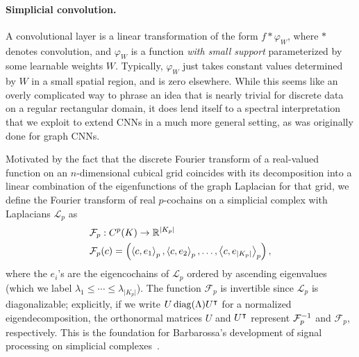 \paragraph{Simplicial convolution.}
 
A convolutional layer is a linear transformation of the form $f\ast \varphi_W$, where $\ast$ denotes convolution, and $\varphi_W$ is a function
\emph{with small support} 
parameterized by some learnable weights $W$.
Typically, $\varphi_W$ just takes constant values determined by $W$ in a small spatial region, and is zero elsewhere.
While this seems like an overly complicated way to phrase an idea that is nearly trivial for discrete data on a regular rectangular domain, it does lend itself to a spectral interpretation that we exploit to extend CNNs in a much more general setting, as was originally done for graph CNNs.

Motivated by the fact that the discrete Fourier transform of a real-valued function on an $n$-dimensional cubical grid coincides with its decomposition into a linear combination of the eigenfunctions of the graph Laplacian for that grid, we define the Fourier transform of real $p$-cochains on a simplicial complex with Laplacians $\mathcal{L}_p$ as
\begin{align*}
  &\mathcal{F}_p: C^p(K) \to \mathbb{R}^{\lvert K_p \rvert} \\
  &\mathcal{F}_p(c) = \left(\left\langle c , e_1 \right\rangle_p, \left\langle c , e_2 \right\rangle_p, \dotsc, \left\langle c , e_{\lvert K_p \rvert} \right\rangle_p\right),
\end{align*}
where the $e_i$'s are the eigencochains of $\mathcal{L}_p$ ordered by ascending eigenvalues (which we label $\lambda_1\leq\dotsm\leq\lambda_{\lvert K_p \rvert}$). The function $\mathcal{F}_p$ is invertible since $\mathcal{L}_p$ is diagonalizable; explicitly, if we write $U\operatorname{diag}(\Lambda)U^{\intercal}$ for a normalized eigendecomposition, the orthonormal matrices $U$ and $U^{\intercal}$ represent $\mathcal{F}^{-1}_p$ and $\mathcal{F}_p$, respectively. This is the foundation for Barbarossa's development of signal processing on simplicial complexes~\cite{barbarossa2018learning}.

